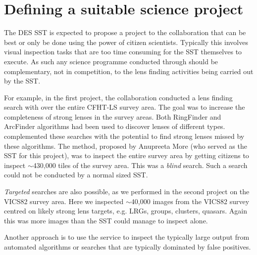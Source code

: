 \documentclass[a4paper,twocolumn]{article}
\begin{document}


\section{Defining a suitable \SW science project}
\label{sec:project}

The DES SST is expected to propose a project to the \SW collaboration that can be best or only be done using the power of citizen scientists. Typically this involves visual inspection tasks that are too time consuming for the SST themselves to execute. As such any science programme conducted through \SW should be complementary, not in competition, to the lens finding activities being carried out by the SST.

For example, in the first \SW project, the \SW collaboration conducted a lens finding search with \SW over the entire CFHT-LS survey area. The goal was to increase the completeness of strong lenses in the survey areas. Both RingFinder and ArcFinder algorithms had been used to discover lenses of different types. \SW complemented these searches with the potential to find strong lenses missed by these algorithms. The method, proposed by Anupreeta More (who served as the SST for this project), was to inspect the entire survey area by getting citizens to inspect $\sim$430,000 tiles of the survey area. This was a \textit{blind} search. Such a search could not be conducted by a normal sized SST.

\textit{Targeted} searches are also possible, as we performed in the second \SW project on the VICS82 survey area. Here we inspected $\sim$40,000 images from the VICS82 survey centred on likely strong lens targets, e.g. LRGs, groups, clusters, quasars.  Again this was more images than the SST could manage to inspect alone.

Another approach is to use the \SW service to inspect the typically large output from automated algorithms or searches that are typically dominated by false positives.
\end{document}
